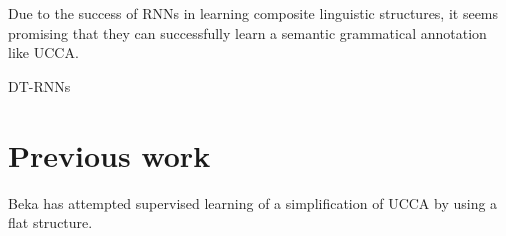 \documentclass[11pt]{article}
\begin{document}
Due to the success of RNNs in learning composite linguistic structures, it seems promising that they can successfully learn a semantic grammatical annotation like UCCA.

DT-RNNs


\section{Previous work}

Beka \cite{beka2013thesis} has attempted supervised learning of a simplification of UCCA by using a flat structure.


{}

\end{document}

